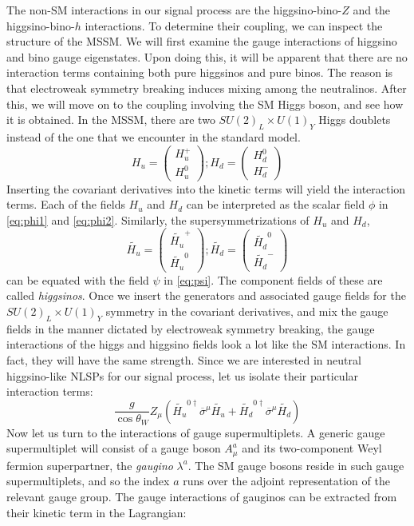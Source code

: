 The non-SM interactions in our signal process are the higgsino-bino-$Z$ and the higgsino-bino-$h$ interactions. To determine their coupling, we can inspect the structure of the MSSM. We will first examine the gauge interactions of higgsino and bino gauge eigenstates. Upon doing this, it will be apparent that there are no interaction terms containing both pure higgsinos and pure binos. The reason is that electroweak symmetry breaking induces mixing among the neutralinos. After this, we will move on to the coupling involving the SM Higgs boson, and see how it is obtained. 
In the MSSM, there are two $SU(2)_L\times U(1)_Y$ Higgs doublets instead of the one that we encounter in the standard model.
\[H_u = \begin{pmatrix}H_u^+\\H_u^0\end{pmatrix};
H_d = \begin{pmatrix}H_d^0\\H_d^-\end{pmatrix}\]
Inserting the covariant derivatives into the kinetic terms will yield the interaction terms. Each of the fields $H_u$ and $H_d$ can be interpreted as the scalar field $\phi$ in \autoref{eq:phi1} and \autoref{eq:phi2}. Similarly, the supersymmetrizations of $H_u$ and $H_d$,
\[\widetilde{H_u} = \begin{pmatrix}\widetilde{H_u}^+\\\widetilde{H_u}^0\end{pmatrix};
\widetilde{H_d} = \begin{pmatrix}\widetilde{H_d}^0\\\widetilde{H_d}^-\end{pmatrix}\]
can be equated with the field $\psi$ in \autoref{eq:psi}. The component fields of these are called \emph{higgsinos}. Once we insert the generators and associated gauge fields for the $SU(2)_L\times U(1)_Y$ symmetry in the covariant derivatives, and mix the gauge fields in the manner dictated by electroweak symmetry breaking, the gauge interactions of the higgs and higgsino fields look a lot like the SM interactions. In fact, they will have the same strength. Since we are interested in neutral higgsino-like NLSPs for our signal process, let us isolate their particular interaction terms:
\[\frac{g}{\cos\theta_W}Z_\mu\left(\widetilde{H_u}^{0\dagger}\overline{\sigma}^\mu \widetilde{H_u}+
\widetilde{H_d}^{0\dagger}\overline{\sigma}^\mu \widetilde{H_d}\right)\]
Now let us turn to the interactions of gauge supermultiplets. A generic gauge supermultiplet will consist of a gauge boson $A_\mu^a$ and its two-component Weyl fermion superpartner, the \emph{gaugino} $\lambda^a$. The SM gauge bosons reside in such gauge supermultiplets, and so the index $a$ runs over the adjoint representation of the relevant gauge group. The gauge interactions of gauginos can be extracted from their kinetic term in the Lagrangian:
